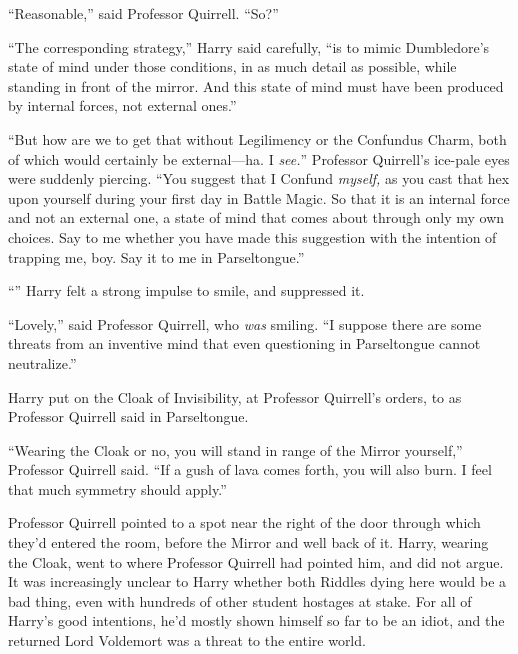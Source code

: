 “Reasonable,” said Professor Quirrell. “So?”

“The corresponding strategy,” Harry said carefully, “is to mimic Dumbledore’s
state of mind under those conditions, in as much detail as possible, while
standing in front of the mirror. And this state of mind must have been produced
by internal forces, not external ones.”

“But how are we to get that without Legilimency or the Confundus Charm, both of
which would certainly be external—ha. I \emph{see.}” Professor Quirrell’s
ice-pale eyes were suddenly piercing. “You suggest that I Confund
\emph{myself,} as you cast that hex upon yourself during your first day in
Battle Magic. So that it is an internal force and not an external one, a state
of mind that comes about through only my own choices. Say to me whether you
have made this suggestion with the intention of trapping me, boy. Say it to me
in Parseltongue.”

“” Harry felt
a strong impulse to smile, and suppressed it.

“Lovely,” said Professor Quirrell, who \emph{was} smiling. “I suppose there are
some threats from an inventive mind that even questioning in Parseltongue
cannot neutralize.”

\later

Harry put on the Cloak of Invisibility, at Professor Quirrell’s orders, to
 as Professor Quirrell said in Parseltongue.

“Wearing the Cloak or no, you will stand in range of the Mirror yourself,”
Professor Quirrell said. “If a gush of lava comes forth, you will also burn. I
feel that much symmetry should apply.”

Professor Quirrell pointed to a spot near the right of the door through which
they’d entered the room, before the Mirror and well back of it. Harry, wearing
the Cloak, went to where Professor Quirrell had pointed him, and did not argue.
It was increasingly unclear to Harry whether both Riddles dying here would be a
bad thing, even with hundreds of other student hostages at stake. For all of
Harry’s good intentions, he’d mostly shown himself so far to be an idiot, and
the returned Lord Voldemort was a threat to the entire world.

